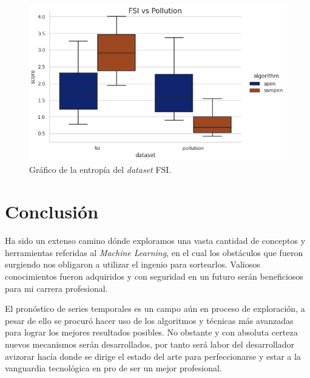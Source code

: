 \documentclass[a4paper,12pt]{article}
\begin{document}
\begin{figure}[H]
	\begin{center}
	\includegraphics[width=1\textwidth]{fsi_vs_pollution.png}
  	\caption{Gráfico de la entropía del \textit{dataset} FSI.}
  	\label{fig:en_fsi}
  	\end{center}
\end{figure}

\clearpage

\section{Conclusión}
Ha sido un extenso camino dónde exploramos una vasta cantidad de conceptos y herramientas referidas al \textit{Machine Learning}, en el cual los obstáculos que fueron surgiendo nos obligaron a utilizar el ingenio para sortearlos. Valiosos conocimientos fueron adquiridos y con seguridad en un futuro serán beneficiosos para mi carrera profesional.

El pronóstico de series temporales es un campo aún en proceso de exploración, a pesar de ello se procuró hacer uso de los algoritmos y técnicas más avanzadas para lograr los mejores resultados posibles. No obstante y con absoluta certeza nuevos mecanismos serán desarrollados, por tanto será labor del desarrollador avizorar hacía donde se dirige el estado del arte para perfeccionarse y estar a la vanguardia tecnológica en pro de ser un mejor profesional.

\clearpage

{}

%
%
\end{document}
